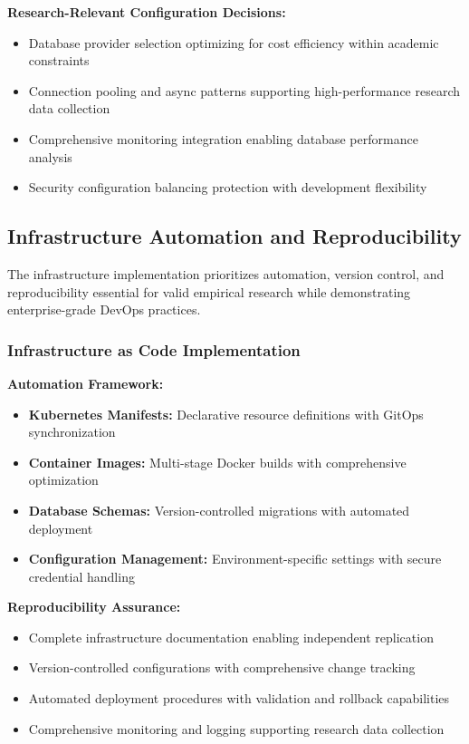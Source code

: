 \textbf{Research-Relevant Configuration Decisions:}
\begin{itemize}
\item Database provider selection optimizing for cost efficiency within academic constraints
\item Connection pooling and async patterns supporting high-performance research data collection
\item Comprehensive monitoring integration enabling database performance analysis
\item Security configuration balancing protection with development flexibility
\end{itemize}

\subsection{Infrastructure Automation and Reproducibility}

The infrastructure implementation prioritizes automation, version control, and reproducibility essential for valid empirical research while demonstrating enterprise-grade DevOps practices.

\subsubsection{Infrastructure as Code Implementation}

\textbf{Automation Framework:}
\begin{itemize}
\item \textbf{Kubernetes Manifests:} Declarative resource definitions with GitOps synchronization
\item \textbf{Container Images:} Multi-stage Docker builds with comprehensive optimization
\item \textbf{Database Schemas:} Version-controlled migrations with automated deployment
\item \textbf{Configuration Management:} Environment-specific settings with secure credential handling
\end{itemize}

\textbf{Reproducibility Assurance:}
\begin{itemize}
\item Complete infrastructure documentation enabling independent replication
\item Version-controlled configurations with comprehensive change tracking
\item Automated deployment procedures with validation and rollback capabilities
\item Comprehensive monitoring and logging supporting research data collection
\end{itemize}


